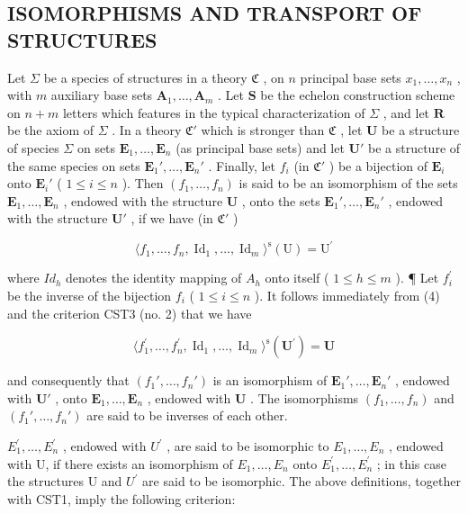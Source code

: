 \subsection{ISOMORPHISMS AND TRANSPORT OF STRUCTURES}

Let \(\Sigma\) be a species of structures in a theory \(\mathfrak{C}\) , on \(n\) principal base sets \(x_{1},\ldots ,x_{n}\) , with \(m\) auxiliary base sets \(\mathbf{A}_1,\dots ,\mathbf{A}_m\) . Let \(\mathbf{S}\) be the echelon construction scheme on \(n + m\) letters which features in the typical characterization of \(\Sigma\) , and let \(\mathbf{R}\) be the axiom of \(\Sigma\) . In a theory \(\mathfrak{C}'\) which is stronger than \(\mathfrak{C}\) , let \(\mathbf{U}\) be a structure of species \(\Sigma\) on sets \(\mathbf{E}_1,\ldots ,\mathbf{E}_n\) (as principal base sets) and let \(\mathbf{U}'\) be a structure of the same species on sets \(\mathbf{E}_1',\ldots ,\mathbf{E}_n'\) . Finally, let \(f_{i}\) (in \(\mathfrak{C}'\) ) be a bijection of \(\mathbf{E}_i\) onto \(\mathbf{E}_i'\) ( \(1 \leqslant i \leqslant n\) ). Then \((f_1, \ldots, f_n)\) is said to be an isomorphism of the sets \(\mathbf{E}_1, \ldots, \mathbf{E}_n\) , endowed with the structure \(\mathbf{U}\) , onto the sets \(\mathbf{E}_1', \ldots, \mathbf{E}_n'\) , endowed with the structure \(\mathbf{U}'\) , if we have (in \(\mathfrak{C}'\) )

\[
\langle f _ {1}, \dots , f _ {n}, \operatorname{Id} _ {1}, \dots , \operatorname{Id} _ {m} \rangle^ {\mathrm{s}} (\mathrm{U}) = \mathrm{U} ^ {\prime}\tag{4}
\]

where \(Id_{h}\) denotes the identity mapping of \(A_{h}\) onto itself ( \(1 \leqslant h \leqslant m\) ). ¶ Let \(f_{i}^{\prime}\) be the inverse of the bijection \(f_{i}\) ( \(1 \leqslant i \leqslant n\) ). It follows immediately from (4) and the criterion CST3 (no. 2) that we have

\[
\langle f _ {1} ^ {\prime}, \dots , f _ {n} ^ {\prime}, \operatorname{Id} _ {1}, \dots , \operatorname{Id} _ {m} \rangle^ {\mathrm{s}} (\mathbf {U} ^ {\prime}) = \mathbf {U}
\]

and consequently that \((f_1', \ldots, f_n')\) is an isomorphism of \(\mathbf{E}_1', \ldots, \mathbf{E}_n'\) , endowed with \(\mathbf{U}'\) , onto \(\mathbf{E}_1, \ldots, \mathbf{E}_n\) , endowed with \(\mathbf{U}\) . The isomorphisms \((f_1, \ldots, f_n)\) and \((f_1', \ldots, f_n')\) are said to be inverses of each other.

\(E_{1}^{\prime}, \ldots, E_{n}^{\prime}\) , endowed with \(U^{\prime}\) , are said to be isomorphic to \(E_{1}, \ldots, E_{n}\) , endowed with U, if there exists an isomorphism of \(E_{1}, \ldots, E_{n}\) onto \(E_{1}^{\prime}, \ldots, E_{n}^{\prime}\) ; in this case the structures U and \(U^{\prime}\) are said to be isomorphic. The above definitions, together with CST1, imply the following criterion:

